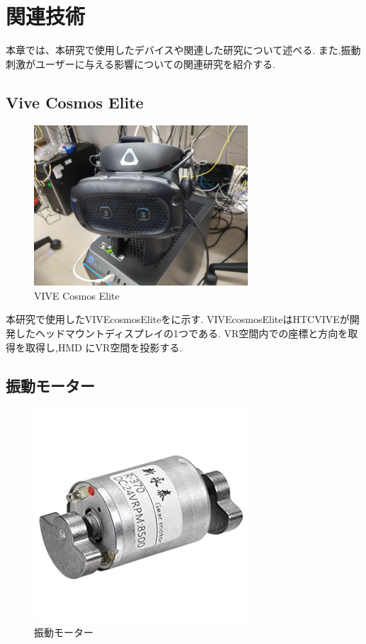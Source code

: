 \chapter{関連技術}
本章では、本研究で使用したデバイスや関連した研究について述べる.
また,振動刺激がユーザーに与える影響についての関連研究を紹介する.

% 




\section{Vive Cosmos Elite}

\begin{figure}[h]
\centering
\includegraphics[clip,width=8cm]{./fig/VIVE.JPG}
\caption{VIVE Cosmos Elite}\label{VIVE}
\end{figure}
本研究で使用したVIVEcosmosEliteをに示す.
VIVEcosmosEliteはHTCVIVEが開発したヘッドマウントディスプレイの1つである.
VR空間内での座標と方向を取得を取得し,HMD にVR空間を投影する.

\newpage

\section{振動モーター}

\begin{figure}[h]
\centering
\includegraphics[clip,width=8cm]{./fig/Motor.jpg}
\caption{振動モーター}\label{motor}
\end{figure}

